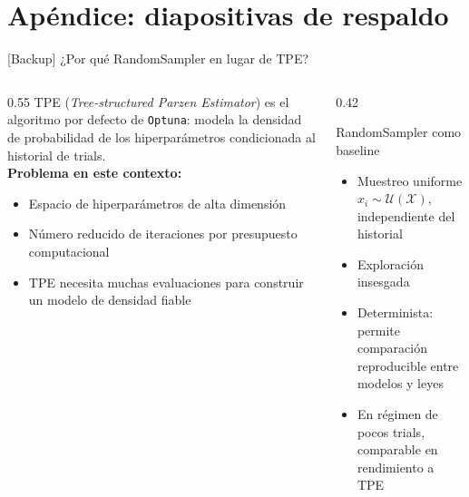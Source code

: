 \documentclass[10pt, aspectratio=169]{beamer}
\begin{document}
\appendix
\section*{Apéndice: diapositivas de respaldo}

\begin{frame}{[Backup] ¿Por qué RandomSampler en lugar de TPE?}
  \begin{columns}[T]
    \begin{column}{0.55\textwidth}
      TPE (\textit{Tree-structured Parzen Estimator}) es el
      algoritmo por defecto de \texttt{Optuna}: modela la densidad
      de probabilidad de los hiperparámetros condicionada al historial
      de trials.\\[0.5em]
      \textbf{Problema en este contexto:}
      \begin{itemize}
        \item Espacio de hiperparámetros de alta dimensión
        \item Número reducido de iteraciones por presupuesto
              computacional
        \item TPE necesita muchas evaluaciones para construir
              un modelo de densidad fiable
      \end{itemize}
    \end{column}
    \begin{column}{0.42\textwidth}
      \begin{block}{RandomSampler como baseline}
        \begin{itemize}
          \item Muestreo uniforme $x_i \sim \mathcal{U}(\mathcal{X})$,
                independiente del historial
          \item Exploración insesgada
          \item Determinista: permite comparación reproducible
                entre modelos y leyes
          \item En régimen de pocos trials, comparable en rendimiento a TPE
        \end{itemize}
      \end{block}
    \end{column}
  \end{columns}
\end{frame}
\end{document}
